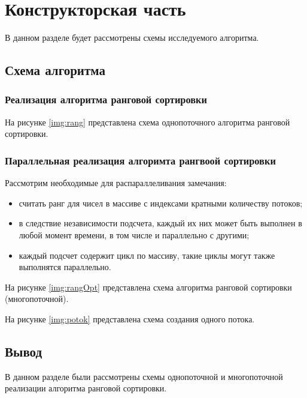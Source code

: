 \chapter{Конструкторская часть}
В данном разделе будет рассмотрены схемы исследуемого алгоритма.

\section{Схема алгоритма}

\subsection{Реализация алгоритма ранговой сортировки}
На рисунке \ref{img:rang} представлена схема однопоточного алгоритма ранговой сортировки.


\clearpage

\subsection{Параллельная реализация алгоримта рангвоой сортировки}

Рассмотрим необходимые для распараллеливания замечания:
\begin{itemize}
	\item считать ранг для чисел в массиве с индексами кратными количеству потоков;
	\item в следствие независимости подсчета, каждый их них может быть выполнен в любой момент времени, в том числе и параллельно с другими;
	\item каждый подсчет содержит цикл по массиву, такие циклы могут также выполнятся параллельно.
\end{itemize}


На рисунке \ref{img:rangOpt} представлена схема алгоритма ранговой сортировки (многопоточной).


\clearpage

На рисунке \ref{img:potok} представлена схема создания одного потока.


\clearpage



\section*{Вывод}

В данном разделе были рассмотрены схемы однопоточной и
многопоточной реализации алгоритма ранговой сортировки.
